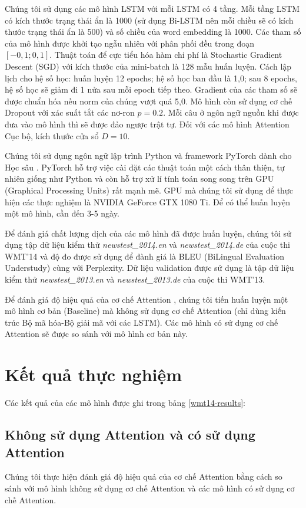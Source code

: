 Chúng tôi sử dụng các mô hình LSTM với mỗi LSTM có 4 tầng. Mỗi tầng LSTM có kích thước trạng thái ẩn là 1000 (sử dụng Bi-LSTM nên mỗi chiều sẽ có kích thước trạng thái ẩn là 500) và số chiều của word embedding là 1000. Các tham số của mô hình được khởi tạo ngẫu nhiên với phân phối đều trong đoạn $[-0,1; 0,1]$. Thuật toán để cực tiểu hóa hàm chi phí là Stochastic Gradient Descent (SGD) với kích thước của mini-batch là 128 mẫu huấn luyện. Cách lập lịch cho hệ số học: huấn luyện 12 epochs; hệ số học ban đầu là 1,0; sau 8 epochs, hệ số học sẽ giảm đi 1 nửa sau mỗi epoch tiếp theo. Gradient của các tham số sẽ được chuẩn hóa nếu norm của chúng vượt quá 5,0. Mô hình còn sử dụng cơ chế Dropout với xác suất tắt các nơ-ron $p = 0.2$. Mỗi câu ở ngôn ngữ nguồn khi được đưa vào mô hình thì sẽ được đảo ngược trật tự. Đối với các mô hình Attention Cục bộ, kích thước cửa sổ $D = 10$.

Chúng tôi sử dụng ngôn ngữ lập trình Python và framework PyTorch dành cho Học sâu \cite{pytorchworkshop}. PyTorch hỗ trợ việc cài đặt các thuật toán một cách thân thiện, tự nhiên giống như Python và còn hỗ trợ xử lí tính toán song song trên GPU (Graphical Processing Units) rất mạnh mẽ. GPU mà chúng tôi sử dụng để thực hiện các thực nghiệm là NVIDIA GeForce GTX 1080 Ti. Để có thể huấn luyện một mô hình, cần đến 3-5 ngày.

Để đánh giá chất lượng dịch của các mô hình đã được huấn luyện, chúng tôi sử dụng tập dữ liệu kiểm thử \textit{newstest\_2014.en} và \textit{newstest\_2014.de} của cuộc thi WMT'14 và độ đo được sử dụng để đành giá là BLEU (BiLingual Evaluation Understudy) \cite{BLEUpaper} cùng với Perplexity. Dữ liệu validation được sử dụng là tập dữ liệu kiểm thử \textit{newstest\_2013.en} và \textit{newstest\_2013.de} của cuộc thi WMT'13.

Để đánh giá độ hiệu quả của cơ chế Attention , chúng tôi tiến huấn luyện một mô hình cơ bản (Baseline) mà không sử dụng cơ chế Attention (chỉ dùng kiến trúc Bộ mã hóa-Bộ giải mã với các LSTM). Các mô hình có sử dụng cơ chế Attention sẽ được so sánh với mô hình cơ bản này.

\section{Kết quả thực nghiệm}
Các kết quả của các mô hình được ghi trong bảng \ref{wmt14-results}:

\subsection{Không sử dụng Attention và có sử dụng Attention}
Chúng tôi thực hiện đánh giá độ hiệu quả của cơ chế Attention bằng cách so sánh với mô hình không sử dụng cơ chế Attention và các mô hình có sử dụng cơ chế Attention.

